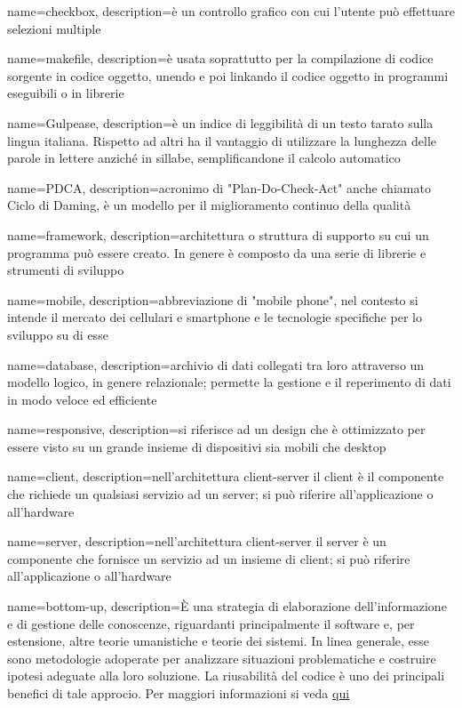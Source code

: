  {
	name=checkbox,
	description={è un controllo grafico con cui l'utente può effettuare selezioni multiple}
}


 {
	name=makefile,
	description={è usata soprattutto per la compilazione di codice sorgente in codice oggetto, unendo e poi linkando il codice oggetto in programmi eseguibili o in librerie}
}

 {
	name=Gulpease,
	description={è un indice di leggibilità di un testo tarato sulla lingua italiana. Rispetto ad altri ha il vantaggio di utilizzare la lunghezza delle parole in lettere anziché in sillabe, semplificandone il calcolo automatico}
}

 {
	name=PDCA,
	description={acronimo di "Plan-Do-Check-Act" anche chiamato Ciclo di Daming, è un modello per il miglioramento continuo della qualità}
}

 {
	name=framework,
	description={architettura o struttura di supporto su cui un programma può essere creato. In genere è composto da una serie di librerie e strumenti di sviluppo}
}

 {
	name=mobile,
	description={abbreviazione di "mobile phone", nel contesto si intende il mercato dei cellulari e smartphone e le tecnologie specifiche per lo sviluppo su di esse}
}

 {
	name=database,
	description={archivio di dati collegati tra loro attraverso un modello logico, in genere relazionale; permette la gestione e il reperimento di dati in modo veloce ed efficiente}
}

 {
	name=responsive,
	description={si riferisce ad un design che è ottimizzato per essere visto su un grande insieme di dispositivi sia mobili che desktop}
}

 {
	name=client,
	description={nell'architettura client-server il client è il componente che richiede un qualsiasi servizio ad un server; si può riferire all'applicazione o all'hardware}
}

 {
	name=server,
	description={nell'architettura client-server il server è un componente che fornisce un servizio ad un insieme di client; si può riferire all'applicazione o all'hardware}
}

 {
	name=bottom-up,
	description={È una strategia di elaborazione dell'informazione e di gestione delle conoscenze, riguardanti principalmente il software e, per estensione, altre teorie umanistiche e teorie dei sistemi. In linea generale, esse sono metodologie adoperate per analizzare situazioni problematiche e costruire ipotesi adeguate alla loro soluzione. La riusabilità del codice è uno dei principali benefici di tale approcio. Per maggiori informazioni si veda \href{https://it.wikipedia.org/wiki/Progettazione_top-down_e_bottom-up}{qui}}
}

